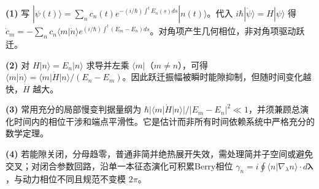 \par\noindent\textbf{(1)} 写 \(|\psi(t)\rangle=\sum_n c_n(t)e^{-(i/\hbar)\int^t E_n(s)ds}|n(t)\rangle\)。代入 \(i\hbar|\dot\psi\rangle=H|\psi\rangle\) 得 \(\dot c_m=-\sum_nc_n\langle m|\dot n\rangle e^{(i/\hbar)\int^t(E_m-E_n)ds}\)。对角项产生几何相位，非对角项驱动跃迁。
\par\noindent\textbf{(2)} 对 \(H|n\rangle=E_n|n\rangle\) 求导并左乘 \(\langle m|\)（\(m\ne n\)），可得 \(\langle m|\dot n\rangle=\langle m|\dot H|n\rangle/(E_n-E_m)\)。因此跃迁振幅被瞬时能隙抑制，但随时间变化越快，\(\dot H\) 越大。
\par\noindent\textbf{(3)} 常用充分的局部慢变判据量纲为 \(\hbar|\langle m|\dot H|n\rangle|/|E_m-E_n|^2\ll1\)，并须兼顾总演化时间内的相位干涉和端点平滑性。它是估计而非所有时间依赖系统中严格充分的数学定理。
\par\noindent\textbf{(4)} 若能隙关闭，分母趋零，普通非简并绝热展开失效，需处理简并子空间或避免交叉；对闭合参数回路，沿单一本征态演化可积累Berry相位 \(\gamma_n=i\oint\langle n|\nabla_\lambda n\rangle\cdot d\boldsymbol\lambda\)，与动力相位不同且规范不变模 \(2\pi\)。
